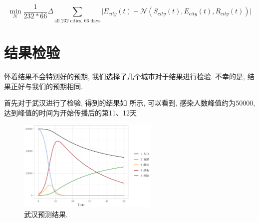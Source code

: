 \documentclass[lang=cn,11pt]{elegantpaper}
\begin{document}
\begin{equation}
	\min_{\mathcal N} \dfrac{1}{232*66}\Delta \sum_{\text{all 232 cities, 66 days}}\Big|E_{city}(t)-\mathcal N(S_{city}(t),E_{city}(t),R_{city}(t))\Big|
\end{equation}

\section{结果检验}
怀着结果不会特别好的预期, 我们选择了几个城市对于结果进行检验. 不幸的是, 结果正好与我们的预期相同. 

首先对于武汉进行了检验, 得到的结果如 所示, 可以看到, 感染人数峰值约为50000, 达到峰值的时间为开始传播后的第11、12天
\begin{figure}[htbp]
  \centering
  \hspace{25pt}\includegraphics[width=0.6\textwidth]{wh1}
  \caption{武汉预测结果. \label{fig:wh}}
\end{figure}

\newpage



\end{document}
